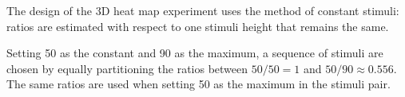 \documentclass[phd]{nuthesis}
\begin{document}
\begin{Shaded}
\begin{Highlighting}[]
\NormalTok{(}\NormalTok{)}
\end{Highlighting}
\end{Shaded}

The design of the 3D heat map experiment uses the method of constant
stimuli: ratios are estimated with respect to one stimuli height that
remains the same.

Setting 50 as the constant and 90 as the maximum, a sequence of stimuli
are chosen by equally partitioning the ratios between \(50/50=1\) and
\(50/90\approx0.556\). The same ratios are used when setting 50 as the
maximum in the stimuli pair.

\begin{Shaded}
\begin{Highlighting}[]
\SpecialCharTok{\%\textgreater{}\%} 
  \NormalTok{(} \NormalTok{(}\SpecialCharTok{+} 
  \NormalTok{(} \NormalTok{, } \NormalTok{, } \NormalTok{, } \NormalTok{) }\SpecialCharTok{+} 
  \NormalTok{(}\NormalTok{(} \NormalTok{), } \NormalTok{), } \NormalTok{) }\SpecialCharTok{+} 
  \NormalTok{() }\SpecialCharTok{+} 
  \NormalTok{(}\NormalTok{, } \NormalTok{, } \NormalTok{, } \StringTok{\textquotesingle{}*\textquotesingle{}}\NormalTok{, } \NormalTok{) }\SpecialCharTok{+}
  \NormalTok{(} \StringTok{\textquotesingle{}\textquotesingle{}}\NormalTok{, } \NormalTok{) }\SpecialCharTok{+}
  \NormalTok{(} \SpecialCharTok{:}\NormalTok{) }\SpecialCharTok{+} 

\end{Highlighting}
\end{Shaded}
\end{document}
